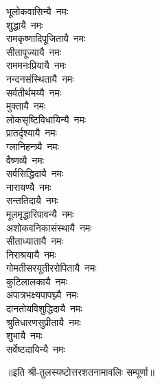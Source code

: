 \begin{multicols}{2}
\begin{flushleft}
भूलोकवासिन्यै~नमः\\
शुद्धायै~नमः\\
रामकृष्णादिपूजितायै~नमः\\
सीतापूज्यायै~नमः\\
राममनःप्रियायै~नमः\\
नन्दनसंस्थितायै~नमः\\
सर्वतीर्थमय्यै~नमः\\
मुक्तायै~नमः\hfill{}‌\\
लोकसृष्टिविधायिन्यै~नमः\\
प्रातर्दृश्यायै~नमः\\
ग्लानिहन्त्र्यै~नमः\\
वैष्णव्यै~नमः\\
सर्वसिद्धिदायै~नमः\\
नारायण्यै~नमः\\
सन्ततिदायै~नमः\\
मूलमृद्धारिपावन्यै~नमः\\
अशोकवनिकासंस्थायै~नमः\\
सीताध्यातायै~नमः\hfill{}‌\\
निराश्रयायै~नमः\\
गोमतीसरयूतीररोपितायै~नमः\\
कुटिलालकायै~नमः\\
अपात्रभक्ष्यपापघ्न्यै~नमः\\
दानतोयविशुद्धिदायै~नमः\\
श्रुतिधारणसुप्रीतायै~नमः\\
शुभायै~नमः\\
सर्वेष्टदायिन्यै~नमः\hfill{}\\
\end{flushleft}
\end{multicols}
॥इति श्री-तुलस्यष्टोत्तरशतनामावलिः सम्पूर्णा॥
